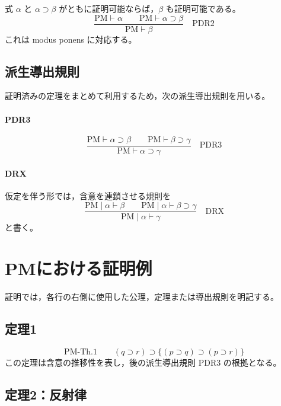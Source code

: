\documentclass[../main.tex]{subfiles}
\begin{document}
式 \(\alpha\) と \(\alpha\supset\beta\) がともに証明可能ならば，\(\beta\) も証明可能である。
\[
  \frac{\mathrm{PM}\vdash\alpha
    \qquad
    \mathrm{PM}\vdash\alpha\supset\beta}
       {\mathrm{PM}\vdash\beta}
  \quad\mathrm{PDR2}
\]
これは modus ponens に対応する。

\subsection{派生導出規則}

証明済みの定理をまとめて利用するため，次の派生導出規則を用いる。

\paragraph{PDR3}

\[
  \frac{\mathrm{PM}\vdash\alpha\supset\beta
    \qquad
    \mathrm{PM}\vdash\beta\supset\gamma}
       {\mathrm{PM}\vdash\alpha\supset\gamma}
  \quad\mathrm{PDR3}
\]

\paragraph{DRX}

仮定を伴う形では，含意を連鎖させる規則を
\[
  \frac{\mathrm{PM}\mid\alpha\vdash\beta
    \qquad
    \mathrm{PM}\mid\alpha\vdash\beta\supset\gamma}
       {\mathrm{PM}\mid\alpha\vdash\gamma}
  \quad\mathrm{DRX}
\]
と書く。

\section{PMにおける証明例}

証明では，各行の右側に使用した公理，定理または導出規則を明記する。

\subsection{定理1}

\[
  \mathrm{PM\text{-}Th.1}
  \qquad
  (q\supset r)
  \supset
  \{(p\supset q)\supset(p\supset r)\}
\]
この定理は含意の推移性を表し，後の派生導出規則 PDR3 の根拠となる。

\subsection{定理2：反射律}
\end{document}
